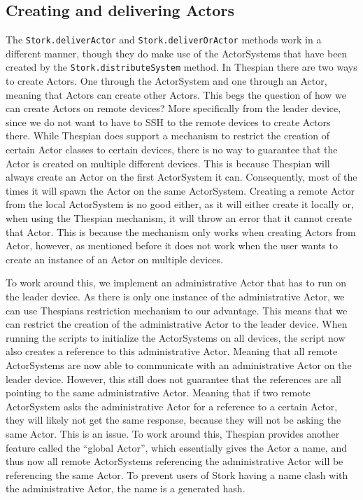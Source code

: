 \documentclass[a4paper]{article}
\begin{document}
\subsection{Creating and delivering Actors}
The \lstinline|Stork.deliverActor| and \lstinline|Stork.deliverOrActor| methods work in a different manner, though they do make use of the ActorSystems that have been created by the \lstinline|Stork.distributeSystem| method. In Thespian there are two ways to create Actors. One through the ActorSystem and one through an Actor, meaning that Actors can create other Actors.
This begs the question of how we can create Actors on remote devices? More specifically from the leader device, since we do not want to have to SSH to the remote devices to create Actors there. While Thespian does support a mechanism to restrict the creation of certain Actor classes to certain devices, there is no way to guarantee that the Actor is created on multiple different devices. This is because Thespian will always create an Actor on the first ActorSystem it can. Consequently, most of the times it will spawn the Actor on the same ActorSystem.
Creating a remote Actor from the local ActorSystem is no good either, as it will either create it locally or, when using the Thespian mechanism, it will throw an error that it cannot create that Actor. This is because the mechanism only works when creating Actors from Actor, however, as mentioned before it does not work when the user wants to create an instance of an Actor on multiple devices.

To work around this, we implement an administrative Actor that has to run on the leader device. As there is only one instance of the administrative Actor, we can use Thespians restriction mechanism to our advantage. This means that we can restrict the creation of the administrative Actor to the leader device. When running the scripts to initialize the ActorSystems on all devices, the script now also creates a reference to this administrative Actor. Meaning that all remote ActorSystems are now able to communicate with an administrative Actor on the leader device. However, this still does not guarantee that the references are all pointing to the same administrative Actor. Meaning that if two remote ActorSystem asks the administrative Actor for a reference to a certain Actor, they will likely not get the same response, because they will not be asking the same Actor. This is an issue. To work around this, Thespian provides another feature called the \enquote{global Actor}, which essentially gives the Actor a name, and thus now all remote ActorSystems referencing the administrative Actor will be referencing the same Actor. To prevent users of Stork having a name clash with the administrative Actor, the name is a generated hash.
\end{document}
